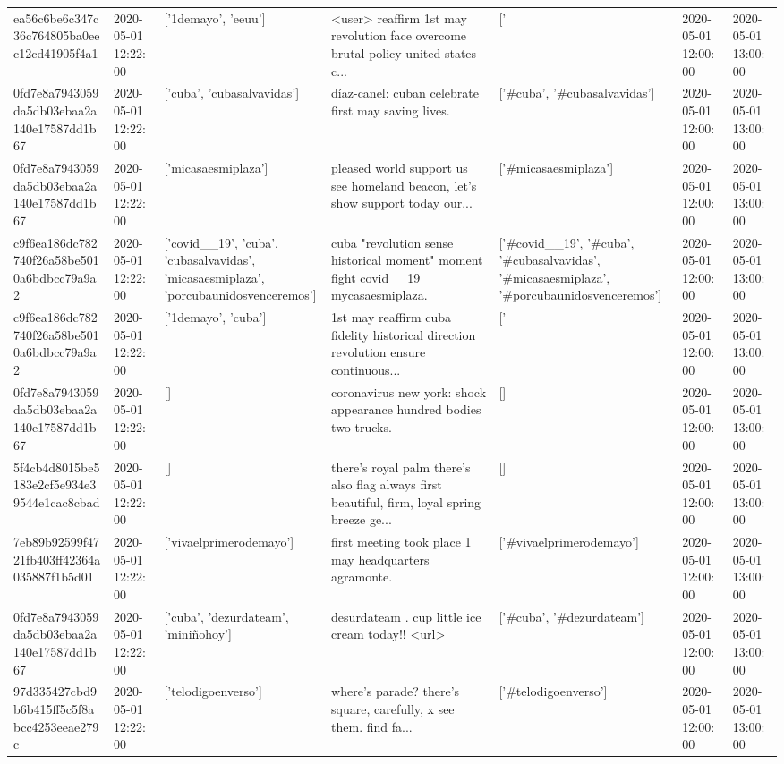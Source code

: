 \begin{tabular}{lllllll}
ea56c6be6c347c36c764805ba0eec12cd41905f4a1 & 2020-05-01 12:22:00 & ['1demayo', 'eeuu'] & <user> reaffirm 1st may revolution face overcome brutal policy united states c... & ['#1demayo', '#eeuu'] & 2020-05-01 12:00:00 & 2020-05-01 13:00:00 \\
0fd7e8a7943059da5db03ebaa2a140e17587dd1b67 & 2020-05-01 12:22:00 & ['cuba', 'cubasalvavidas'] & díaz-canel: cuban celebrate first may saving lives. & ['#cuba', '#cubasalvavidas'] & 2020-05-01 12:00:00 & 2020-05-01 13:00:00 \\
0fd7e8a7943059da5db03ebaa2a140e17587dd1b67 & 2020-05-01 12:22:00 & ['micasaesmiplaza'] & pleased world support us see homeland beacon, let's show support today our... & ['#micasaesmiplaza'] & 2020-05-01 12:00:00 & 2020-05-01 13:00:00 \\
c9f6ea186dc782740f26a58be5010a6bdbcc79a9a2 & 2020-05-01 12:22:00 & ['covid__19', 'cuba', 'cubasalvavidas', 'micasaesmiplaza', 'porcubaunidosvenceremos'] & cuba "revolution sense historical moment" moment fight covid\_\_19 mycasaesmiplaza. & ['#covid__19', '#cuba', '#cubasalvavidas', '#micasaesmiplaza', '#porcubaunidosvenceremos'] & 2020-05-01 12:00:00 & 2020-05-01 13:00:00 \\
c9f6ea186dc782740f26a58be5010a6bdbcc79a9a2 & 2020-05-01 12:22:00 & ['1demayo', 'cuba'] & 1st may reaffirm cuba fidelity historical direction revolution ensure continuous... & ['#1demayo', '#cuba'] & 2020-05-01 12:00:00 & 2020-05-01 13:00:00 \\
0fd7e8a7943059da5db03ebaa2a140e17587dd1b67 & 2020-05-01 12:22:00 & [] & coronavirus new york: shock appearance hundred bodies two trucks. & [] & 2020-05-01 12:00:00 & 2020-05-01 13:00:00 \\
5f4cb4d8015be5183e2cf5e934e39544e1cac8cbad & 2020-05-01 12:22:00 & [] & there's royal palm there's also flag always first beautiful, firm, loyal spring breeze ge... & [] & 2020-05-01 12:00:00 & 2020-05-01 13:00:00 \\
7eb89b92599f4721fb403ff42364a035887f1b5d01 & 2020-05-01 12:22:00 & ['vivaelprimerodemayo'] & first meeting took place 1 may headquarters agramonte. & ['#vivaelprimerodemayo'] & 2020-05-01 12:00:00 & 2020-05-01 13:00:00 \\
0fd7e8a7943059da5db03ebaa2a140e17587dd1b67 & 2020-05-01 12:22:00 & ['cuba', 'dezurdateam', 'miniñohoy'] & desurdateam . cup little ice cream today!!️ <url> & ['#cuba', '#dezurdateam'] & 2020-05-01 12:00:00 & 2020-05-01 13:00:00 \\
97d335427cbd9b6b415ff5c5f8abcc4253eeae279c & 2020-05-01 12:22:00 & ['telodigoenverso'] & where's parade? there's square, carefully, x see them. find fa... & ['#telodigoenverso'] & 2020-05-01 12:00:00 & 2020-05-01 13:00:00 \\

\end{tabular}
